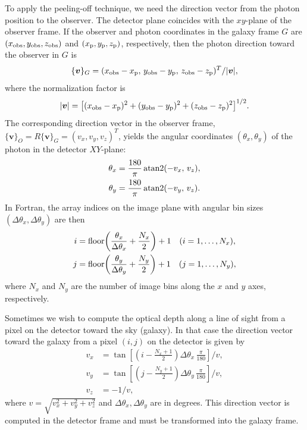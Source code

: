 \documentclass[english,a4paper]{my_memo}
\begin{document}
To apply the peeling-off technique, we need the direction vector
from the photon position to the observer. The detector plane
coincides with the $xy$-plane of the observer frame. If the
observer and photon coordinates in the galaxy frame $G$ are
$(x_{\rm obs}, y_{\rm obs}, z_{\rm obs})$ and
$(x_{\rm p}, y_{\rm p}, z_{\rm p})$, respectively, then the photon
direction toward the observer in $G$ is
\[
\{\boldsymbol{v}\}_{G} =
  (x_{\rm obs}-x_{\rm p},\, y_{\rm obs}-y_{\rm p},\, z_{\rm obs}-z_{\rm p})^{T}/|\boldsymbol{v}|,
\]
where the normalization factor is
\[
|\boldsymbol{v}|=\bigl[(x_{\rm obs}-x_{\rm p})^{2}+(y_{\rm obs}-y_{\rm p})^{2}+(z_{\rm obs}-z_{\rm p})^{2}\bigr]^{1/2}.
\]
The corresponding direction vector in the observer frame,
$\{\boldsymbol{v}\}_{O}=R\{\boldsymbol{v}\}_{G}=(v_{x},v_{y},v_{z})^{T}$,
yields the angular coordinates $(\theta_{x},\theta_{y})$ of the
photon in the detector $XY$-plane:
\begin{align*}
\theta_{x} & = \frac{180}{\pi}\,{\rm atan2}(-v_{x},\,v_{z}),\\
\theta_{y} & = \frac{180}{\pi}\,{\rm atan2}(-v_{y},\,v_{z}).
\end{align*}
In Fortran, the array indices on the image plane with angular
bin sizes $(\Delta\theta_{x},\Delta\theta_{y})$ are then
\begin{align*}
i & = {\rm floor}\!\left(\frac{\theta_{x}}{\Delta\theta_{x}}+\frac{N_{x}}{2}\right)+1\quad (i=1,\ldots,N_{x}),\\
j & = {\rm floor}\!\left(\frac{\theta_{y}}{\Delta\theta_{y}}+\frac{N_{y}}{2}\right)+1\quad (j=1,\ldots,N_{y}),
\end{align*}
where $N_{x}$ and $N_{y}$ are the number of image bins along the
$x$ and $y$ axes, respectively.

Sometimes we wish to compute the optical depth along a line of
sight from a pixel on the detector toward the sky (galaxy). In
that case the direction vector toward the galaxy from a pixel
$(i,j)$ on the detector is given by
\begin{align*}
v_{x} & = \tan\!\left[\left(i-\tfrac{N_{x}+1}{2}\right)\Delta\theta_{x}\,\tfrac{\pi}{180}\right]\big/v,\\
v_{y} & = \tan\!\left[\left(j-\tfrac{N_{y}+1}{2}\right)\Delta\theta_{y}\,\tfrac{\pi}{180}\right]\big/v,\\
v_{z} & = -1/v,
\end{align*}
where $v=\sqrt{v_{x}^{2}+v_{y}^{2}+v_{z}^{2}}$ and
$\Delta\theta_{x},\Delta\theta_{y}$ are in degrees. This direction
vector is computed in the detector frame and must be transformed
into the galaxy frame.
\end{document}
